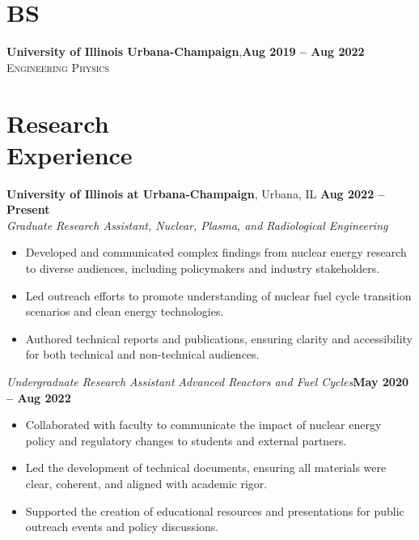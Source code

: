 \documentclass[margin,line]{resume}
\begin{document}
\begin{resume}
    \section{\mysidestyle BS}
    \textbf{University of Illinois Urbana-Champaign},\hfill\textbf{Aug 2019 -- Aug 2022}\\%
    \textsc{Engineering Physics}\\
    \vspace{-5mm}

    \section{\mysidestyle Research\\Experience}
    \textbf{University of Illinois at Urbana-Champaign}, Urbana, IL \hfill \textbf{Aug 2022 -- Present} \\
    \textsl{Graduate Research Assistant, Nuclear, Plasma, and Radiological Engineering} \\
    \begin{itemize}
        \item Developed and communicated complex findings from nuclear energy research to diverse audiences, including policymakers and industry stakeholders.
        \item Led outreach efforts to promote understanding of nuclear fuel cycle transition scenarios and clean energy technologies.
        \item Authored technical reports and publications, ensuring clarity and accessibility for both technical and non-technical audiences.
    \end{itemize}

    \textsl{Undergraduate Research Assistant} \textsl{Advanced Reactors and Fuel Cycles}\hfill \textbf{May 2020 -- Aug 2022}\\
    \begin{itemize}
        \item Collaborated with faculty to communicate the impact of nuclear energy policy and regulatory changes to students and external partners.
        \item Led the development of technical documents, ensuring all materials were clear, coherent, and aligned with academic rigor.
        \item Supported the creation of educational resources and presentations for public outreach events and policy discussions.
    \end{itemize}


\end{resume}
\end{document}
